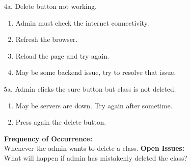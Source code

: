 \documentclass[12pt]{article}
\begin{document}
4a. Delete button not working.
\begin{enumerate}
\item Admin must check the internet connectivity.
\item Refresh the browser.
\item Reload the page and try again.
\item May be some backend issue, try to resolve that issue.
\end{enumerate}
5a. Admin clicks the sure button but class is not deleted.
\begin{enumerate}
\item May be servers are down. Try again after sometime.
\item Press again the delete button.
\end{enumerate}
\textbf{Frequency of Occurrence:}\\
Whenever the admin wants to delete a class.
\textbf{Open Issues:}\\
What will happen if admin has mistakenly deleted the class?
\end{document}
